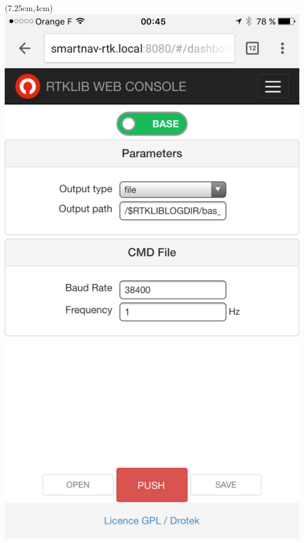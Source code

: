 \documentclass[xetex,с,aspectratio=169]{beamer}
\begin{document}
\begin{frame}
\begin{textblock*}{3.5cm}
  \end{textblock*}
  \begin{textblock*}{1.75cm}(7.25cm,4cm)
    \includegraphics[width=\textwidth]{../img/drotek-web}
  \end{textblock*}
\end{frame}
\end{document}
